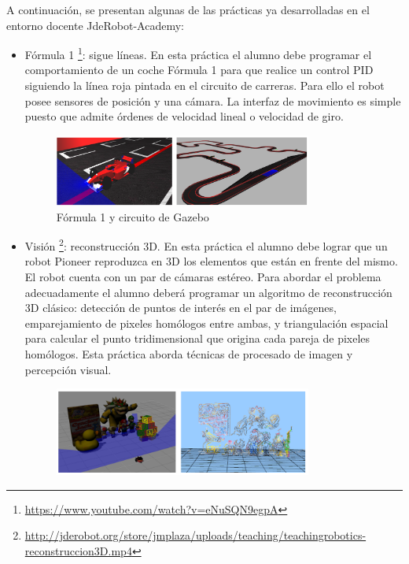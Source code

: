 A continuación, se presentan algunas de las prácticas ya desarrolladas en el entorno docente JdeRobot-Academy:

\begin{itemize}
\item Fórmula 1 \footnote{\url{https://www.youtube.com/watch?v=eNuSQN9egpA}}: sigue líneas. En esta práctica el alumno debe programar el comportamiento de un coche Fórmula 1 para que realice un control PID siguiendo la línea roja pintada en el circuito de carreras. Para ello el robot posee sensores de posición y una cámara. La interfaz de movimiento es simple puesto que admite órdenes de velocidad lineal o velocidad de giro.
\begin{figure}[H]
  \begin{center}
    \includegraphics[width=0.8\textwidth]{figures/Introduccion/F1.png}
		\caption{Fórmula 1 y circuito de Gazebo}
		\label{fig.F1}
		\end{center}
\end{figure}
\item Visión \footnote{\url{http://jderobot.org/store/jmplaza/uploads/teaching/teachingrobotics-reconstruccion3D.mp4}}: reconstrucción 3D. En esta práctica el alumno debe lograr que un robot Pioneer reproduzca en 3D los elementos que están en frente del mismo. El robot cuenta con un par de cámaras estéreo. Para abordar el problema adecuadamente el alumno deberá programar un algoritmo de reconstrucción 3D clásico: detección de puntos de interés en el par de imágenes, emparejamiento de pixeles homólogos entre ambas, y triangulación espacial para calcular el punto tridimensional que origina cada pareja de pixeles homólogos. Esta práctica aborda técnicas de procesado de imagen y percepción visual.
\begin{figure}[H]
  \begin{center}
    \includegraphics[width=0.8\textwidth]{figures/Introduccion/3D.png}

\end{center}
\end{figure}
\end{itemize}
